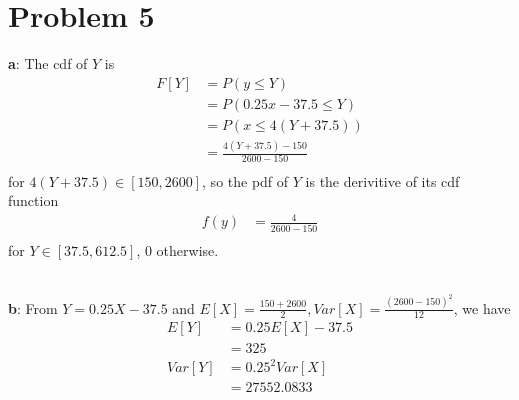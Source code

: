 \documentclass[12pt,letterpaper]{article}
\begin{document}
\section*{Problem 5}
    \textbf{a}: The cdf of $Y$ is
        \begin{equation*}
            \begin{aligned}
                F[Y] &= P(y \leq Y) \\
                &= P(0.25x - 37.5 \leq Y) \\
                &= P(x \leq 4(Y + 37.5)) \\
                &= \frac{4(Y + 37.5) - 150}{2600 - 150} \\
            \end{aligned}
        \end{equation*}
    for $4(Y + 37.5) \in [150, 2600]$, so the pdf of $Y$ is the derivitive of its cdf function
        \begin{equation*}
            \begin{aligned}
                f(y) &= \frac{4}{2600 - 150} \\
            \end{aligned}
        \end{equation*}
    for $Y \in [37.5, 612.5]$, 0 otherwise. \\
     \\
    \textbf{b}: From $Y = 0.25X - 37.5$ and $E[X] = \frac{150 + 2600}{2}, Var[X] = \frac{(2600 - 150)^{2}}{12}$, we have
        \begin{equation*}
            \begin{aligned}
                E[Y] &= 0.25E[X] - 37.5 \\
                &= 325 \\
                Var[Y] &= 0.25^{2}Var[X] \\
                &= 27552.0833 \\
            \end{aligned}
        \end{equation*}
\end{document}
